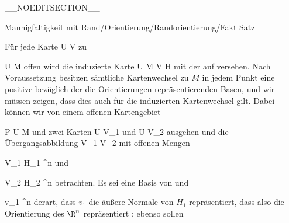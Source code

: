 __NOEDITSECTION__

{Mannigfaltigkeit mit Rand/Orientierung/Randorientierung/Fakt}
{Satz}
{}
{

\faktzusatz {}
\faktzusatz {}

}
{

Für jede
 {} {}
Karte
\maabbdisp {\alpha} { U } { V
} {}
zu

\mavergleichskette
{\vergleichskette
{ U
}
{ \subseteq }{ M
}
{  }{
}
{    }{
}
{   }{
}
}
{}{}{}
offen wird die induzierte Karte
\maabbdisp {} {U \cap \partial M } { V \cap \partial H
} {}
mit der
auf
 versehen. Nach Voraussetzung besitzen sämtliche Kartenwechsel zu $M$ in jedem Punkt eine positive
bezüglich der die Orientierungen repräsentierenden Basen, und wir müssen zeigen, dass dies auch für die induzierten Kartenwechsel gilt. Dabei können wir von einem offenen Kartengebiet

\mavergleichskette
{\vergleichskette
{ P
}
{ \in }{ U
}
{ \subseteq }{ M
}
{    }{
}
{   }{
}
}
{}{}{}
und zwei Karten
 { U } { V_1
} {}
und
 { U } { V_2
} {}
ausgehen und die Übergangsabbildung
 { V_1 } { V_2
} {}
mit offenen Mengen

\mavergleichskette
{\vergleichskette
{ V_1
}
{ \subseteq }{ H_1
}
{ \subset }{ \R^n
}
{    }{
}
{   }{
}
}
{}{}{}
und

\mavergleichskette
{\vergleichskette
{ V_2
}
{ \subseteq }{ H_2
}
{ \subset }{ \R^n
}
{    }{
}
{   }{
}
}
{}{}{}
betrachten. Es sei
 eine Basis von
 und

\mavergleichskette
{\vergleichskette
{ v_1
}
{ \in }{ \R^n
}
{  }{
}
{    }{
}
{   }{
}
}
{}{}{}
derart, dass $v_1$ die äußere Normale von $H_1$ repräsentiert, dass also
 die Orientierung des $\R^n$ repräsentiert
 {} {;}
ebenso sollen

}
